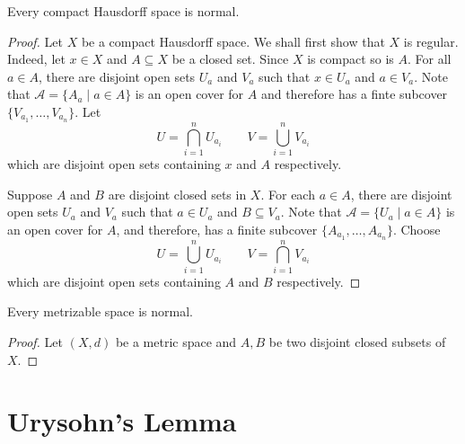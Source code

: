 \begin{theorem}
    Every compact Hausdorff space is normal.
\end{theorem}
\begin{proof}
    Let $X$ be a compact Hausdorff space. We shall first show that $X$ is regular. Indeed, let $x\in X$ and $A\subseteq X$ be a closed set. Since $X$ is compact so is $A$. For all $a\in A$, there are disjoint open sets $U_a$ and $V_a$ such that $x\in U_a$ and $a\in V_a$. Note that $\mathscr{A} = \{A_a\mid a\in A\}$ is an open cover for $A$ and therefore has a finte subcover $\{V_{a_1},\ldots,V_{a_n}\}$. Let 
    \begin{equation*}
        U = \bigcap_{i = 1}^nU_{a_i}\qquad V = \bigcup_{i = 1}^nV_{a_i}
    \end{equation*}
    which are disjoint open sets containing $x$ and $A$ respectively.

    Suppose $A$ and $B$ are disjoint closed sets in $X$. For each $a\in A$, there are disjoint open sets $U_a$ and $V_a$ such that $a\in U_a$ and $B\subseteq V_a$. Note that $\mathscr{A} = \{U_a\mid a\in A\}$ is an open cover for $A$, and therefore, has a finite subcover $\{A_{a_1},\ldots,A_{a_n}\}$. Choose 
    \begin{equation*}
        U = \bigcup_{i = 1}^n U_{a_i}\qquad V = \bigcap_{i = 1}^nV_{a_i}
    \end{equation*}
    which are disjoint open sets containing $A$ and $B$ respectively.
\end{proof}

\begin{theorem}
    Every metrizable space is normal.
\end{theorem}
\begin{proof}
    Let $(X,d)$ be a metric space and $A,B$ be two disjoint closed subsets of $X$. 
\end{proof}

\section{Urysohn's Lemma}

